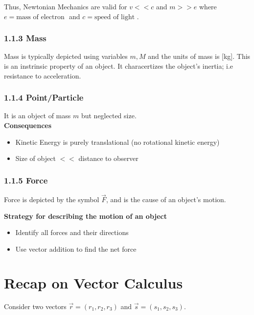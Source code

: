 \documentclass{article}
\newtheorem{one minute paper}[theorem]{One Minute Paper}
\begin{document}
Thus, Newtonian Mechanics are valid for $v << c$ and $m >> e$ where $e = \text{mass of electron }$ and $c = \text{speed of light }$. 

\subsubsection*{1.1.3 Mass}

Mass is typically depicted using variables $m, M$ and the units of mass is [kg]. This is an instrinsic property of an object. It characertizes the object's inertia; i.e resistance to acceleration.

\subsubsection*{1.1.4 Point/Particle}

It is an object of mass $m$ but neglected size. \\

\textbf{Consequences}
\begin{itemize}
    \item Kinetic Energy is purely translational (no rotational kinetic energy)
    \item Size of object $<<$ distance to observer
\end{itemize}

\subsubsection*{1.1.5 Force}

Force is depicted by the symbol $\vec{F}$, and is the cause of an object's motion.

\textbf{Strategy for describing the motion of an object}
\begin{itemize}
    \item Identify all forces and their directions
    \item Use vector addition to find the net force
\end{itemize}

\section*{Recap on Vector Calculus}

Consider two vectors $\vec{r} = (r_1, r_2, r_3)$ and $\vec{s} = (s_1, s_2, s_3)$. 
\end{document}
